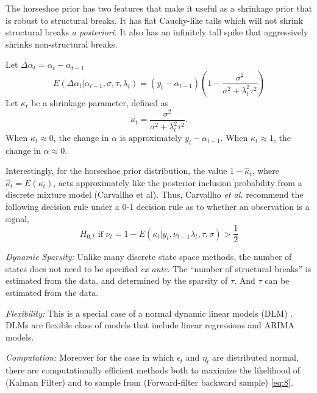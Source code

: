 \documentclass{article}
\begin{document}
The horseshoe prior has two features that make it useful as a shrinkage prior that is robust to structural breaks.
It has flat Cauchy-like tails which will not shrink structural breaks \textit{a posteriori}. 
It also has an infinitely tall spike that aggressively shrinks non-structural breaks.



Let $\Delta \alpha_{t} = \alpha_{t} - \alpha_{t - 1}$
\begin{equation}
  \label{eq:10}
  E(\Delta \alpha_{t} | \alpha_{t - 1}, \sigma, \tau, \lambda_{t}) = (y_{t} - \alpha_{t - 1})
  \left(
    1 - \frac{\sigma^{2}}{\sigma^{2} + \lambda^{2}_{t} \tau^{2}}
  \right)
\end{equation}
Let $\kappa_{t}$ be a shrinkage parameter, defined as
\begin{equation}
  \label{eq:3}
  \kappa_{t} = \frac{\sigma^{2}}{\sigma^{2} + \lambda^{2}_{t} \tau^{2}} \text{.}
\end{equation}
When $\kappa_{t} \approx 0$, the change in $\alpha$ is approximately $y_{t} - \alpha_{t-1}$.
When $\kappa_{t} \approx 1$, the change in $\alpha \approx 0$.

Interestingly, for the horseshoe prior distribution, the value $1 - \hat\kappa_{t}$, where $\hat\kappa_{t} = E(\kappa_{t})$, acts approximately like the posterior inclusion probability from a discrete mixture model (Carvallho et al).
Thus, Carvallho \textit{et al.} recommend the following  decision rule under a 0-1 decision rule as to whether an observation is a signal,
\begin{equation}
  \label{eq:5}
  \text{$H_{0,t}$ if $\nu_{t} = 1 - E(\kappa_{t}|y_{t}, \nu_{t-1} \lambda_{t}, \tau, \sigma) > \frac{1}{2}$}
\end{equation}

\textit{Dynamic Sparsity:} Unlike many discrete state space methods, the number of states does not need to be specified \textit{ex ante}.
The ``number of structural breaks'' is estimated from the data, and determined by the sparsity of $\tau$. 
And $\tau$ can be estimated from the data.

\textit{Flexibility:} This is a special case of a normal dynamic linear models (DLM) \parencites{WestHarrison1997}{DurbinKoopman2012}{CommandeurKoopman2007}{ShumwayStoffer2010}.
DLMs are flexible class of models that include linear regressions and ARIMA models.

\textit{Computation:} Moreover for the case in which $\epsilon_{t}$ and $\eta_{t}$ are distributed normal, there are computationally efficient methods both to maximize the likelihood of (Kalman Filter) and to sample from (Forward-filter backward sample) \eqref{eq:8}.
\end{document}
